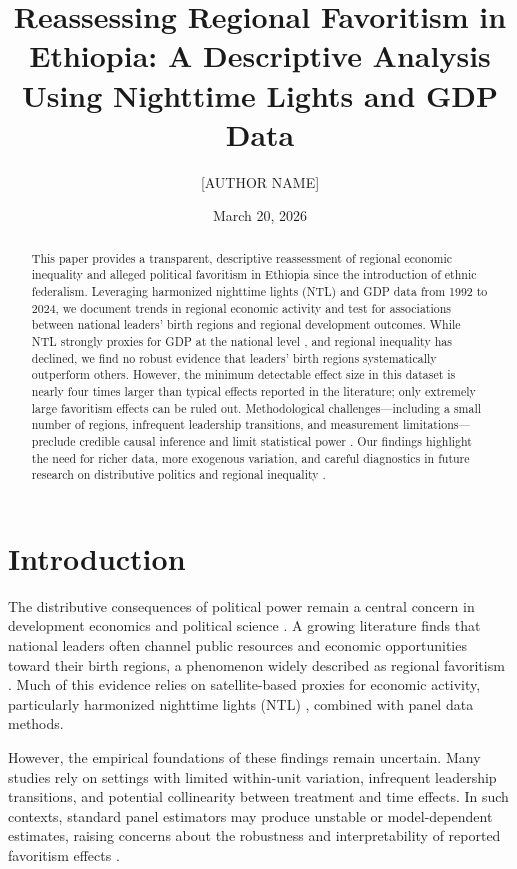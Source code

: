 \documentclass[12pt,a4paper]{article}
\title{Reassessing Regional Favoritism in Ethiopia: A Descriptive Analysis Using Nighttime Lights and GDP Data}
\author{[AUTHOR NAME]}
\date{March 20, 2026}
\begin{document}
\maketitle


\begin{abstract}
This paper provides a transparent, descriptive reassessment of regional economic inequality and alleged political favoritism in Ethiopia since the introduction of ethnic federalism. Leveraging harmonized nighttime lights (NTL) and GDP data from 1992 to 2024, we document trends in regional economic activity and test for associations between national leaders’ birth regions and regional development outcomes. While NTL strongly proxies for GDP at the national level \citep{Chen2011,Henderson2012,Li2023}, and regional inequality has declined, we find no robust evidence that leaders’ birth regions systematically outperform others. However, the minimum detectable effect size in this dataset is nearly four times larger than typical effects reported in the literature; only extremely large favoritism effects can be ruled out. Methodological challenges—including a small number of regions, infrequent leadership transitions, and measurement limitations—preclude credible causal inference and limit statistical power \citep{Angrist2009,Bertrand2004,Imbens2015}. Our findings highlight the need for richer data, more exogenous variation, and careful diagnostics in future research on distributive politics and regional inequality \citep{Bickenbach2016,WorldBank2024}.
\end{abstract}


\section{Introduction}

The distributive consequences of political power remain a central concern in development economics and political science \citep{PerssonTabellini2000}. A growing literature finds that national leaders often channel public resources and economic opportunities toward their birth regions, a phenomenon widely described as regional favoritism \citep{Hodler2014, BeiserMcGrath2021, Onana2024}. Much of this evidence relies on satellite-based proxies for economic activity, particularly harmonized nighttime lights (NTL) \citep{Chen2011, Henderson2012, Li2023, Gibson2021}, combined with panel data methods.

However, the empirical foundations of these findings remain uncertain. Many studies rely on settings with limited within-unit variation, infrequent leadership transitions, and potential collinearity between treatment and time effects. In such contexts, standard panel estimators may produce unstable or model-dependent estimates, raising concerns about the robustness and interpretability of reported favoritism effects \citep{Bertrand2004, Angrist2009, Imbens2015}.
\end{document}
